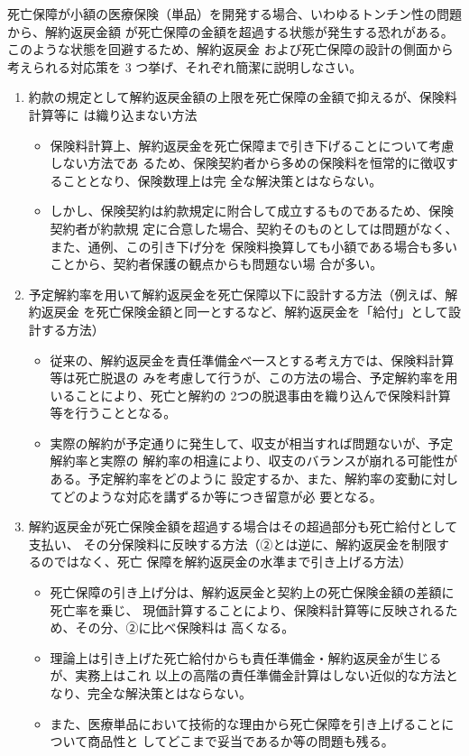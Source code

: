 \documentclass[report,gutter=10mm,fore-edge=10mm,uplatex,dvipdfmx]{jlreq}
\begin{document}
死亡保障が小額の医療保険（単品）を開発する場合、いわゆるトンチン性の問題から、解約返戻金額
が死亡保障の金額を超過する状態が発生する恐れがある。このような状態を回避するため、解約返戻金
および死亡保障の設計の側面から考えられる対応策を 3 つ挙げ、それぞれ簡潔に説明しなさい。
\begin{enumerate}
 \item 約款の規定として解約返戻金額の上限を死亡保障の金額で抑えるが、保険料計算等に
は織り込まない方法
\begin{itemize}
 \item 保険料計算上、解約返戻金を死亡保障まで引き下げることについて考慮しない方法であ
るため、保険契約者から多めの保険料を恒常的に徴収することとなり、保険数理上は完
全な解決策とはならない。
 \item しかし、保険契約は約款規定に附合して成立するものであるため、保険契約者が約款規
定に合意した場合、契約そのものとしては問題がなく、また、通例、この引き下げ分を
保険料換算しても小額である場合も多いことから、契約者保護の観点からも問題ない場
合が多い。
\end{itemize}
 \item 予定解約率を用いて解約返戻金を死亡保障以下に設計する方法（例えば、解約返戻金
を死亡保険金額と同一とするなど、解約返戻金を「給付」として設計する方法）
\begin{itemize}
 \item 従来の、解約返戻金を責任準備金べ一スとする考え方では、保険料計算等は死亡脱退の
みを考慮して行うが、この方法の場合、予定解約率を用いることにより、死亡と解約の
2つの脱退事由を織り込んで保険料計算等を行うこととなる。
 \item 実際の解約が予定通りに発生して、収支が相当すれば問題ないが、予定解約率と実際の
解約率の相違により、収支のバランスが崩れる可能性がある。予定解約率をどのように
設定するか、また、解約率の変動に対してどのような対応を講ずるか等につき留意が必
要となる。
\end{itemize}
 \item 解約返戻金が死亡保険金額を超過する場合はその超過部分も死亡給付として支払い、
その分保険料に反映する方法（②とは逆に、解約返戻金を制限するのではなく、死亡
保障を解約返戻金の水準まで引き上げる方法）
\begin{itemize}
 \item 死亡保障の引き上げ分は、解約返戻金と契約上の死亡保険金額の差額に死亡率を乗じ、
現価計算することにより、保険料計算等に反映されるため、その分、②に比べ保険料は
高くなる。
 \item 理論上は引き上げた死亡給付からも責任準備金・解約返戻金が生じるが、実務上はこれ
以上の高階の責任準備金計算はしない近似的な方法となり、完全な解決策とはならない。
 \item また、医療単品において技術的な理由から死亡保障を引き上げることについて商品性と
してどこまで妥当であるか等の問題も残る。
\end{itemize}
\end{enumerate}
\end{document}
